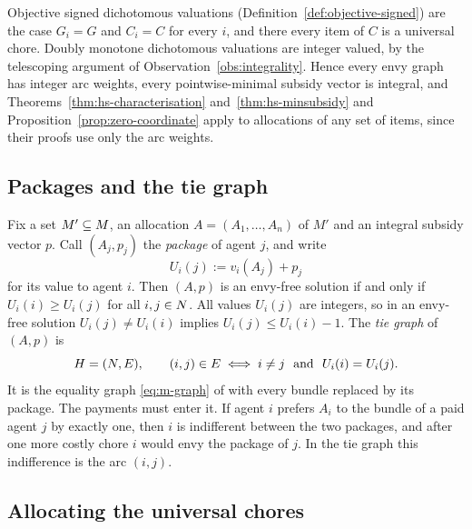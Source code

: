 Objective signed dichotomous valuations (Definition~\ref{def:objective-signed})
are the case $G_i=G$ and $C_i=C$ for every $i$, and there every item of $C$ is a
universal chore. Doubly monotone dichotomous valuations are integer valued, by the
telescoping argument of Observation~\ref{obs:integrality}. Hence every envy graph
has integer arc weights, every pointwise-minimal subsidy vector is integral, and
Theorems~\ref{thm:hs-characterisation} and~\ref{thm:hs-minsubsidy} and
Proposition~\ref{prop:zero-coordinate} apply to allocations of any set of items,
since their proofs use only the arc weights.

\subsection{Packages and the tie graph}
\label{sec:gf-ties}

Fix a set $M'\subseteq M$, an allocation $A=(A_1,\dots,A_n)$ of $M'$ and an
integral subsidy vector $p$. Call $(A_j,p_j)$ the \emph{package} of agent $j$,
and write
\begin{equation}
\label{eq:gf-U}
  U_i(j):=v_i(A_j)+p_j
\end{equation}
for its value to agent $i$. Then $(A,p)$ is an envy-free solution if and only if
$U_i(i)\ge U_i(j)$ for all $i,j\in N$. All values $U_i(j)$ are integers, so
in an envy-free solution $U_i(j)\ne U_i(i)$ implies $U_i(j)\le U_i(i)-1$. The
\emph{tie graph} of $(A,p)$ is
\begin{equation}
\label{eq:gf-H}
  H=(N,E),
  \qquad
  (i,j)\in E \iff i\ne j\ \text{ and }\ U_i(i)=U_i(j).
\end{equation}
It is the equality graph \eqref{eq:m-graph} of  with every
bundle replaced by its package. The payments must enter it. If agent $i$ prefers
$A_i$ to the bundle of a paid agent $j$ by exactly one, then $i$ is indifferent
between the two packages, and after one more costly chore $i$ would envy the
package of $j$. In the tie graph this indifference is the arc $(i,j)$.

\subsection{Allocating the universal chores}
\label{sec:gf-procedure}

